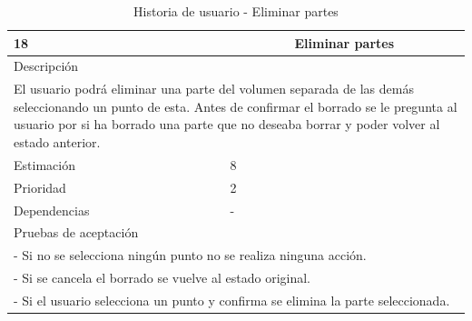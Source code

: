 \begin{table}[H]
	\begin{center}
		\begin{tabular} {|l|c|l|}
			\hline
			18 & \multicolumn{2}{c|}{Eliminar partes} \\ \hline \hline
			\multicolumn{3}{|l|}{Descripción} \\ \hline
			\multicolumn{3}{|p{12cm}|}{El usuario podrá eliminar una parte del volumen separada de las demás seleccionando un punto de esta. Antes de confirmar el borrado se le pregunta al usuario por si ha borrado una parte que no deseaba borrar y poder volver al estado anterior.} \\ \hline
			\multicolumn{2}{|l|}{Estimación} & 8 \\ \hline
			\multicolumn{2}{|l|}{Prioridad} & 2 \\ \hline
			\multicolumn{2}{|l|}{Dependencias} & - \\ \hline
			\multicolumn{3}{|l|}{Pruebas de aceptación} \\ \hline
			\multicolumn{3}{|p{12cm}|}{ - Si no se selecciona ningún punto no se realiza ninguna acción.} \\
			\multicolumn{3}{|p{12cm}|}{ - Si se cancela el borrado se vuelve al estado original.} \\
			\multicolumn{3}{|p{12cm}|}{ - Si el usuario selecciona un punto y confirma se elimina la parte seleccionada.} \\ \hline
		\end{tabular}
	\end{center}
	\caption{Historia de usuario - Eliminar partes}
	\label{tab:hu_eliminar_partes}
\end{table}

